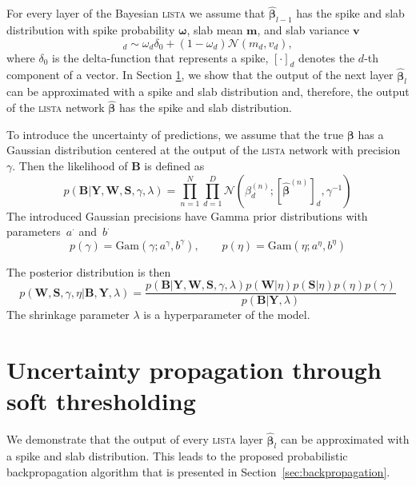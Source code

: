 \documentclass{article}
\begin{document}
For every layer of the Bayesian \textsc{lista} we assume that $\widehat{\boldsymbol\beta}_{l-1}$ has the spike and slab distribution with spike probability $\boldsymbol\omega$, slab mean $\mathbf{m}$, and slab variance $\mathbf{v}$
\begin{equation}
[\widehat{\boldsymbol\beta}_{l-1}]_d \sim \omega_d \delta_0 + (1 - \omega_d)\mathcal{N}(m_d, v_d),
\end{equation}
where $\delta_0$ is the delta-function that represents a spike, $[\cdot]_d$ denotes the $d$-th component of a vector. In Section \ref{sec:fprop}, we show that the output of the next layer $\widehat{\boldsymbol\beta}_l$ can be approximated with a spike and slab distribution and, therefore, the output of the \textsc{lista} network $\widehat{\boldsymbol\beta}$ has the spike and slab distribution.

To introduce the uncertainty of predictions, we assume that the true $\boldsymbol\beta$ has a Gaussian distribution centered at the output of the \textsc{lista} network with precision $\gamma$. Then the likelihood of $\mathbf{B}$ is defined as
\begin{equation}
\label{eq:likelihood}
p(\mathbf{B}| \mathbf{Y}, \mathbf{W}, \mathbf{S}, \gamma, \lambda) = \prod_{n=1}^N\prod_{d=1}^D\mathcal{N}\left(\beta_d^{(n)}; \left[\widehat{\boldsymbol\beta}^{(n)}\right]_d, \gamma^{-1}\right)
\end{equation}
The introduced Gaussian precisions have Gamma prior distributions with parameters~$a^{\cdot}$ and~$b^{\cdot}$
\begin{equation}
\label{eq:gamma_eta}
p(\gamma) = \text{Gam}\left(\gamma; a^{\gamma}, b^{\gamma}\right), \qquad
p(\eta) = \text{Gam}\left(\eta; 	a^{\eta}, b^{\eta}\right)
\end{equation}

The posterior distribution is then
\begin{equation}
\label{eq:posterior}
p(\mathbf{W}, \mathbf{S}, \gamma, \eta | \mathbf{B}, \mathbf{Y}, \lambda) = \frac{p(\mathbf{B} | \mathbf{Y}, \mathbf{W},  \mathbf{S}, \gamma, \lambda) p(\mathbf{W} | \eta )p(\mathbf{S} | \eta) p(\eta) p(\gamma)}{p(\mathbf{B} | \mathbf{Y}, \lambda)}
\end{equation}
The shrinkage parameter $\lambda$ is a hyperparameter of the model.

\section{Uncertainty propagation through soft thresholding}
\label{sec:fprop}
We demonstrate that the output of every \textsc{lista} layer $\widehat{\boldsymbol\beta}_l$ can be approximated with a spike and slab distribution. This leads to the proposed probabilistic backpropagation algorithm that is presented in Section~\ref{sec:backpropagation}.
\end{document}
